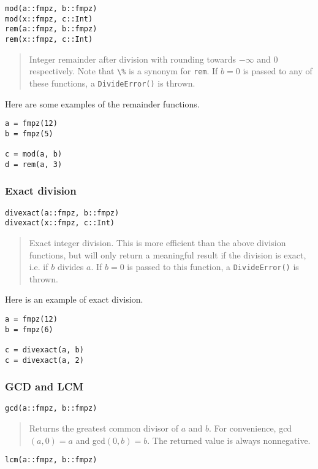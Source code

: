\documentclass[a4paper,10pt]{article}
\newcommand{\code}{\lstinline}
\newcommand{\desc}[1]{\vspace{-3mm}\begin{quote}#1\end{quote}}
\begin{document}
{{\begin{lstlisting}
mod(a::fmpz, b::fmpz)
mod(x::fmpz, c::Int)
rem(a::fmpz, b::fmpz)
rem(x::fmpz, c::Int)
\end{lstlisting}

\desc{Integer remainder after division with rounding towards $-\infty$ and $0$
respectively. Note that \code{\%} is a synonym for \code{rem}. If $b = 0$ is passed to 
any of these functions, a \code{DivideError()} is thrown.}

Here are some examples of the remainder functions.

\begin{lstlisting}
a = fmpz(12)
b = fmpz(5)

c = mod(a, b)
d = rem(a, 3)
\end{lstlisting}

\subsubsection{Exact division}

\begin{lstlisting}
divexact(a::fmpz, b::fmpz)
divexact(x::fmpz, c::Int)
\end{lstlisting}

\desc{Exact integer division. This is more efficient than the above division functions,
but will only return a meaningful result if the division is exact, i.e. if $b$ divides
$a$. If $b = 0$ is passed to this function, a \code{DivideError()} is thrown.}

Here is an example of exact division.

\begin{lstlisting}
a = fmpz(12)
b = fmpz(6)

c = divexact(a, b)
c = divexact(a, 2)
\end{lstlisting}

\subsubsection{GCD and LCM}

\begin{lstlisting}
gcd(a::fmpz, b::fmpz)
\end{lstlisting}

\desc{Returns the greatest common divisor of $a$ and $b$. For convenience, 
gcd$(a, 0) = a$ and gcd$(0, b) = b$. The returned value is always nonnegative.}

\begin{lstlisting}
lcm(a::fmpz, b::fmpz)
\end{lstlisting}

}}
\end{document}
